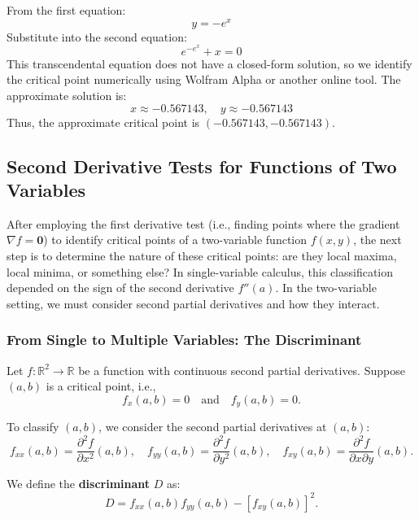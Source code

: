 \begin{example}
\begin{solution}
\begin{enumerate}
\begin{enumerate}
            From the first equation:
            \[
            y = -e^{x}
            \]
            Substitute into the second equation:
            \[
            e^{-e^{x}} + x = 0
            \]
            This transcendental equation does not have a closed-form solution, so we identify the critical point numerically using Wolfram Alpha or another online tool. The approximate solution is:
            \[
            x \approx -0.567143, \quad y \approx -0.567143
            \]
            Thus, the approximate critical point is \( \left( -0.567143, -0.567143 \right) \).
        \end{enumerate}
    \end{enumerate}
    \end{solution}
\end{example}
\exampleline


\subsection*{Second Derivative Tests for Functions of Two Variables} 

\noindent After employing the first derivative test (i.e., finding points where the gradient \(\nabla f = \mathbf{0}\)) to identify critical points of a two-variable function \( f(x,y) \), the next step is to determine the nature of these critical points: are they local maxima, local minima, or something else? In single-variable calculus, this classification depended on the sign of the second derivative \( f''(a) \). In the two-variable setting, we must consider second partial derivatives and how they interact.

\subsubsection*{From Single to Multiple Variables: The Discriminant} 

\noindent Let \( f: \mathbb{R}^2 \to \mathbb{R} \) be a function with continuous second partial derivatives. Suppose \((a,b)\) is a critical point, i.e.,
\[
f_x(a,b)=0 \quad \text{and} \quad f_y(a,b)=0.
\]

\noindent To classify \((a,b)\), we consider the second partial derivatives at \((a,b)\):
\[
f_{xx}(a,b)=\frac{\partial^2 f}{\partial x^2}(a,b), \quad f_{yy}(a,b)=\frac{\partial^2 f}{\partial y^2}(a,b), \quad f_{xy}(a,b)=\frac{\partial^2 f}{\partial x \partial y}(a,b).
\]

\noindent We define the \textbf{discriminant} \( D \) as:
\[
D = f_{xx}(a,b)f_{yy}(a,b) - [f_{xy}(a,b)]^2.
\]


